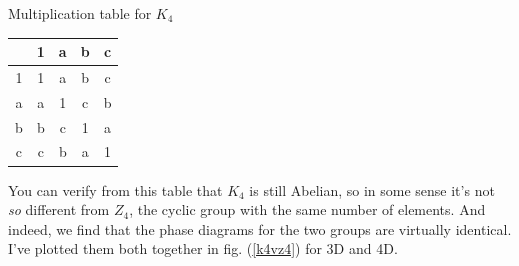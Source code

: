 \documentclass[9pt,twocolumn,twoside]{article}
\begin{document}
\begin{table}[h!]
\centering
Multiplication table for $K_4$

\begin{tabular} {c | c c c c }
& 1 & a & b & c \\
\hline
1 & 1 & a & b & c \\
a & a & 1 & c & b \\
b & b & c & 1 & a \\
c & c & b & a & 1 \\
\end{tabular}
\end{table}

You can verify from this table that $K_4$ is still Abelian, so in some sense it's not \textit{so} different from $Z_4$, the cyclic group with the same number of elements.  And indeed, we find that the phase diagrams for the two groups are virtually identical.  I've plotted them both together in fig. (\ref{k4vz4}) for 3D and 4D.
\end{document}
